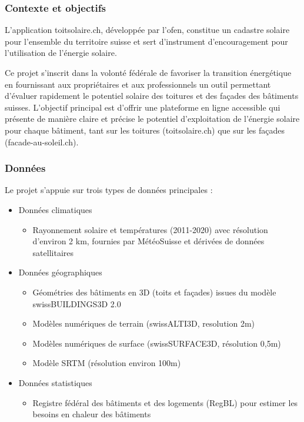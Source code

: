 {\subsubsection{Contexte et objectifs}
\par{L'application toitsolaire.ch, développée par l'\acrshort{ofen}, constitue un cadastre solaire pour l'ensemble du territoire suisse et sert d'instrument d'encouragement pour l'utilisation de l'énergie solaire.}

\par{Ce projet s'inscrit dans la volonté fédérale de favoriser la transition énergétique en fournissant aux propriétaires et aux professionnels un outil permettant d'évaluer rapidement le potentiel solaire des toitures et des façades des bâtiments suisses. L'objectif principal est d'offrir une plateforme en ligne accessible qui présente de manière claire et précise le potentiel d'exploitation de l'énergie solaire pour chaque bâtiment, tant sur les toitures (toitsolaire.ch) que sur les façades (facade-au-soleil.ch).}

\subsubsection{Données}
\par{Le projet s'appuie sur trois types de données principales :}
\begin{itemize}
    \item Données climatiques
    \begin{itemize}
        \item Rayonnement solaire et températures (2011-2020) avec résolution d'environ 2 km, fournies par MétéoSuisse et dérivées de données satellitaires
    \end{itemize}
    \item Données géographiques
    \begin{itemize}
        \item Géométries des bâtiments en 3D (toits et façades) issues du modèle swissBUILDINGS3D 2.0
        \item Modèles numériques de terrain (swissALTI3D, resolution 2m)
        \item Modèles numériques de surface (swissSURFACE3D, résolution 0,5m)
        \item Modèle SRTM (résolution environ 100m)
    \end{itemize}
    \item Données statistiques
        \begin{itemize}
        \item Registre fédéral des bâtiments et des logements (RegBL) pour estimer les besoins en chaleur des bâtiments
        \end{itemize}
    \end{itemize}

}
